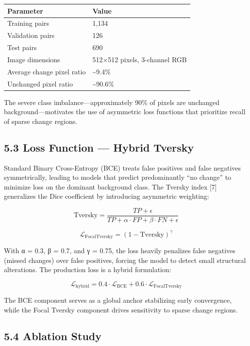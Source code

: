 \documentclass[11pt,a4paper]{article}
\begin{document}
\begin{longtable}[]{@{}ll@{}}
\toprule\noalign{}
Parameter & Value \\
\midrule\noalign{}
\endhead
\bottomrule\noalign{}
\endlastfoot
Training pairs & 1,134 \\
Validation pairs & 126 \\
Test pairs & 690 \\
Image dimensions & 512×512 pixels, 3-channel RGB \\
Average change pixel ratio & \textasciitilde9.4\% \\
Unchanged pixel ratio & \textasciitilde90.6\% \\
\end{longtable}

The severe class imbalance---approximately 90\% of pixels are unchanged background---motivates the use of asymmetric loss functions that prioritize recall of sparse change regions.

\hypertarget{loss-function-hybrid-tversky}{%
\subsection{5.3 Loss Function --- Hybrid Tversky}\label{loss-function-hybrid-tversky}}

Standard Binary Cross-Entropy (BCE) treats false positives and false negatives symmetrically, leading to models that predict predominantly ``no change'' to minimize loss on the dominant background class. The Tversky index [7] generalizes the Dice coefficient by introducing asymmetric weighting:

\[\text{Tversky} = \frac{TP + \epsilon}{TP + \alpha \cdot FP + \beta \cdot FN + \epsilon} \tag{2}\]

\[\mathcal{L}_{\text{FocalTversky}} = (1 - \text{Tversky})^\gamma \tag{3}\]

With α = 0.3, β = 0.7, and γ = 0.75, the loss heavily penalizes false negatives (missed changes) over false positives, forcing the model to detect small structural alterations. The production loss is a hybrid formulation:

\[\mathcal{L}_{\text{hybrid}} = 0.4 \cdot \mathcal{L}_{\text{BCE}} + 0.6 \cdot \mathcal{L}_{\text{FocalTversky}} \tag{4}\]

The BCE component serves as a global anchor stabilizing early convergence, while the Focal Tversky component drives sensitivity to sparse change regions.

\hypertarget{ablation-study}{%
\subsection{5.4 Ablation Study}\label{ablation-study}}
\end{document}

